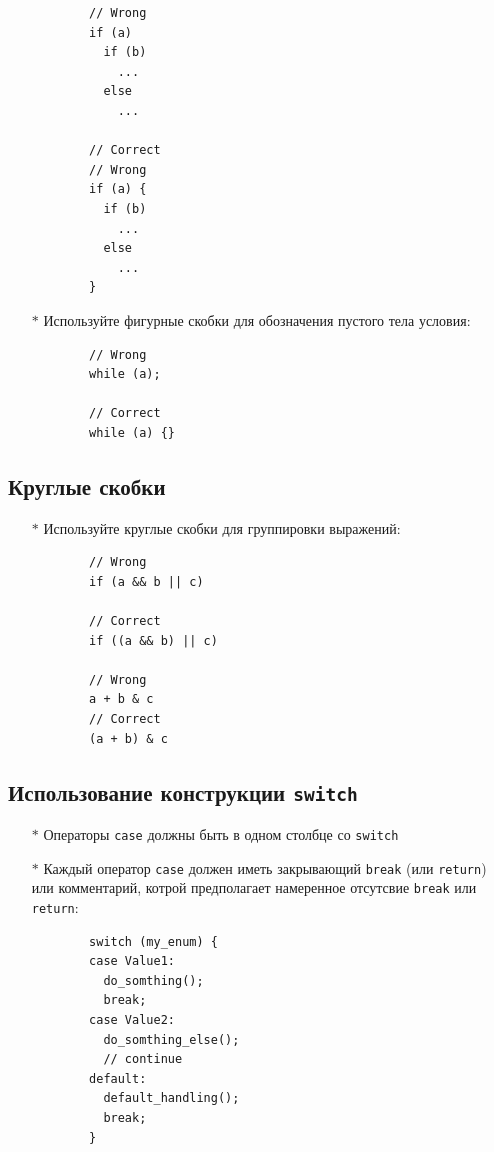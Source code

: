 \documentclass[12pt, twoside]{report}
\begin{document}
\begin{itemize}
\begin{lstlisting}
		// Wrong
		if (a)
		  if (b)
		    ...
		  else
		    ...
	    
		// Correct
		// Wrong
		if (a) {
		  if (b)
		    ...
		  else
		    ...
		}
	\end{lstlisting}
	\item [$*$] Используйте фигурные скобки для обозначения пустого тела условия:
	\begin{lstlisting}
		// Wrong
		while (a);
		
		// Correct
		while (a) {}
	\end{lstlisting}
\end{itemize}

\subsection*{Круглые скобки}\label{lab_work_formatting_brices2}
\begin{itemize}
	\item [$*$] Используйте круглые скобки для группировки выражений:
	\begin{lstlisting}
		// Wrong
		if (a && b || c)
		
		// Correct
		if ((a && b) || c)
		
		// Wrong
		a + b & c
		// Correct
		(a + b) & c
	\end{lstlisting}
\end{itemize}

\subsection*{Использование конструкции \texttt{switch}}\label{lab_work_formatting_switch}
\begin{itemize}
	\item [$*$] Операторы \texttt{case} должны быть в одном столбце со \texttt{switch}
	\item [$*$] Каждый оператор \texttt{case} должен иметь закрывающий \texttt{break} (или \texttt{return}) или комментарий, котрой предполагает намеренное отсутсвие \texttt{break} или \texttt{return}:
	\begin{lstlisting}
		switch (my_enum) {
		case Value1:
		  do_somthing();
		  break;
		case Value2:
		  do_somthing_else();
		  // continue
		default:
		  default_handling();
		  break;
		}
	\end{lstlisting}
\end{itemize}
\end{document}

